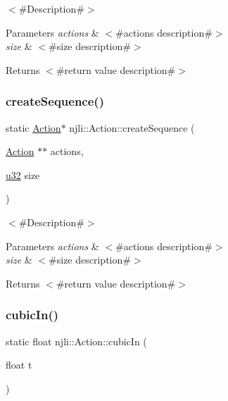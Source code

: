 $<$\#\+Description\#$>$


\begin{DoxyParams}{Parameters}
{\em actions} & $<$\#actions description\#$>$ \\
\hline
{\em size} & $<$\#size description\#$>$\\
\hline
\end{DoxyParams}
\begin{DoxyReturn}{Returns}
$<$\#return value description\#$>$ 
\end{DoxyReturn}
\mbox{\label{classnjli_1_1_action_a292d91fdb630cc406dd6a0f113e977cd}} 
\subsubsection{\texorpdfstring{create\+Sequence()}{createSequence()}}
{\footnotesize\ttfamily static \mbox{\hyperlink{classnjli_1_1_action}{Action}}$\ast$ njli\+::\+Action\+::create\+Sequence (\begin{DoxyParamCaption}\item[{\mbox{\hyperlink{classnjli_1_1_action}{Action}} $\ast$$\ast$}]{actions,  }\item[{\mbox{\hyperlink{_util_8h_a10e94b422ef0c20dcdec20d31a1f5049}{u32}}}]{size }\end{DoxyParamCaption})\hspace{0.3cm}{\ttfamily [static]}}

$<$\#\+Description\#$>$


\begin{DoxyParams}{Parameters}
{\em actions} & $<$\#actions description\#$>$ \\
\hline
{\em size} & $<$\#size description\#$>$\\
\hline
\end{DoxyParams}
\begin{DoxyReturn}{Returns}
$<$\#return value description\#$>$ 
\end{DoxyReturn}
\mbox{\label{classnjli_1_1_action_a95dc3002cea9c237eda7e6c38866f7f9}} 
\subsubsection{\texorpdfstring{cubic\+In()}{cubicIn()}}
{\footnotesize\ttfamily static float njli\+::\+Action\+::cubic\+In (\begin{DoxyParamCaption}\item[{float}]{t }\end{DoxyParamCaption})\hspace{0.3cm}{\ttfamily [static]}}

